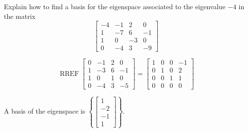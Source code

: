 
\begin{exerciseStatement}


Explain how to find a basis for the eigenspace associated to the eigenvalue \( -4 \) in the matrix \[ \left[\begin{array}{cccc}
-4 & -1 & 2 & 0 \\
1 & -7 & 6 & -1 \\
1 & 0 & -3 & 0 \\
0 & -4 & 3 & -9
\end{array}\right] \]


\end{exerciseStatement}
    
\begin{exerciseAnswer} 


\[\operatorname{RREF} \left[\begin{array}{cccc}
0 & -1 & 2 & 0 \\
1 & -3 & 6 & -1 \\
1 & 0 & 1 & 0 \\
0 & -4 & 3 & -5
\end{array}\right] = \left[\begin{array}{cccc}
1 & 0 & 0 & -1 \\
0 & 1 & 0 & 2 \\
0 & 0 & 1 & 1 \\
0 & 0 & 0 & 0
\end{array}\right] \]



A basis of the eigenspace is \( \left\{ \left[\begin{array}{c}
1 \\
-2 \\
-1 \\
1
\end{array}\right] \right\} \).


\end{exerciseAnswer}
    
